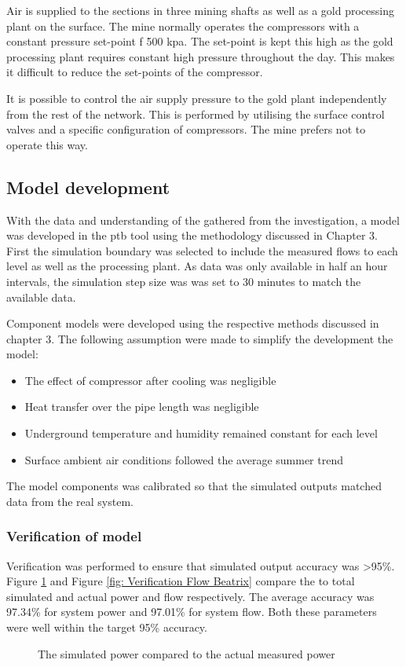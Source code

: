 \par
Air is supplied to the sections in three mining shafts as well as a gold processing plant on the surface.  The mine normally operates the compressors with a constant pressure set-point f 500 \gls{kpa}.  The set-point is  kept this high as the gold processing plant requires constant high pressure throughout the day. This makes it difficult to reduce the set-points of the compressor.
\par
 It is possible to control the air supply pressure to the gold plant independently from the rest of the network. This is performed by utilising the surface control valves and a specific configuration of compressors. The mine prefers not to operate this way.
\subsection{Model development}
With the data and understanding of the gathered from the investigation, a model was developed in the \gls{ptb} tool using the methodology discussed in Chapter 3. First the simulation boundary was selected to include the measured flows to each level as well as the processing plant. As data was only available in half an hour intervals, the simulation step size was was set to 30 minutes to match the available data.
\par
Component models were developed using the respective methods discussed in chapter 3. The following assumption were  made to simplify the development the model:
\begin{itemize}
	\item The effect of compressor after cooling was negligible
	\item Heat transfer over the pipe length was negligible
	\item Underground temperature and humidity remained constant for each level
	\item Surface ambient air conditions followed the average summer trend
\end{itemize} 
The model components was calibrated so that the simulated outputs matched data from the real system.
\subsubsection{Verification of model}
Verification was performed to ensure that simulated output accuracy was >95\%. Figure \ref{fig: Verification Power Beatrix} and Figure \ref{fig: Verification Flow Beatrix} compare the to total simulated and actual power and flow respectively. The average accuracy was 97.34\% for system power and  97.01\% for system flow. Both these parameters were well within the target 95\% accuracy.
\begin{figure}[h]
	\centering
	
	\caption{The simulated power compared to the actual measured power}
	\label{fig: Verification Power Beatrix}
\end{figure}


